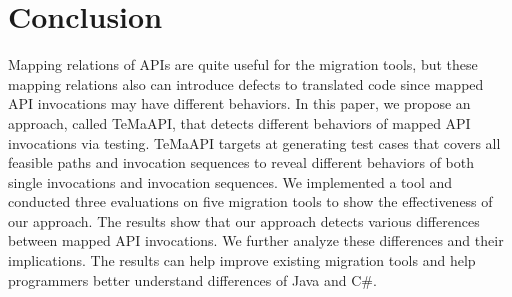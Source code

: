 \section{Conclusion}
\label{sec:conclusion}

Mapping relations of APIs are quite useful for the migration tools, but these mapping relations also can introduce defects to translated code since mapped API invocations may have different behaviors. In this paper, we propose an approach, called TeMaAPI, that detects different behaviors of mapped API invocations via testing. TeMaAPI targets at generating test cases that covers all feasible paths and invocation sequences to reveal different behaviors of both single invocations and invocation sequences. We implemented a tool and conducted three evaluations on five migration tools to show the effectiveness of our approach. The results show that our approach detects various differences between mapped API invocations. We further analyze these differences and their implications. The results can help improve existing migration tools and help programmers better understand differences of Java and C\#.
